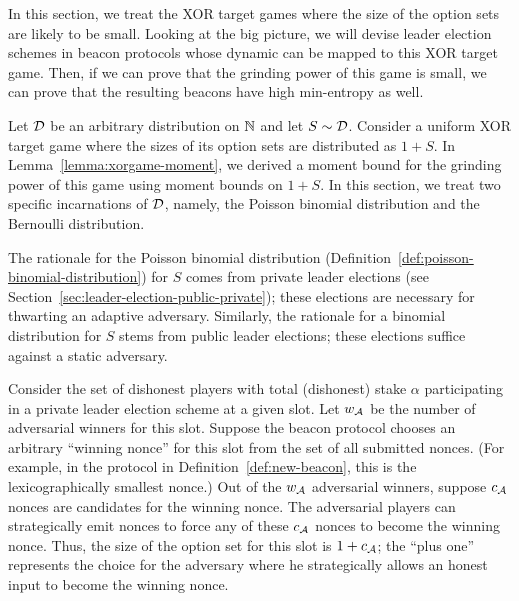 
In this section, 
we treat the XOR target games where 
the size of the option sets are likely to be small. 
Looking at the big picture, 
we will devise leader election schemes in beacon protocols 
whose dynamic can be mapped to this XOR target game.
Then, if we can prove that the grinding power of this game is small, 
we can prove that the resulting beacons have high min-entropy as well.



Let $\mathcal{D}$ be an arbitrary distribution on $\mathbb{N}$ 
and let $S \sim \mathcal{D}$.
Consider a uniform XOR target game where 
the sizes of its option sets are distributed as $1 + S$. 
In Lemma~\ref{lemma:xorgame-moment}, 
we derived a moment bound for the grinding power of this game using moment bounds on $1 + S$. 
In this section, we treat two specific incarnations of $\mathcal{D}$, 
namely, the Poisson binomial distribution and 
the Bernoulli distribution.

The rationale for the Poisson binomial distribution (Definition~\ref{def:poisson-binomial-distribution}) 
for $S$ 
comes from private leader elections (see Section~\ref{sec:leader-election-public-private});
these elections are necessary for thwarting an adaptive adversary.
Similarly, the rationale for a binomial distribution for $S$ stems from 
public leader elections; 
these elections suffice against a static adversary.

Consider the set of dishonest players with total (dishonest) stake $\alpha$ 
participating 
in a private leader election scheme 
at a given slot. 
Let $w_{\mathcal{A}}$ be the number of adversarial winners for this slot.
Suppose the beacon protocol chooses an arbitrary ``winning nonce'' for this slot from the set of all submitted nonces.  
(For example, in the protocol in Definition~\ref{def:new-beacon}, this is the lexicographically smallest nonce.)
Out of the $w_{\mathcal{A}}$ adversarial winners, 
suppose $c_{\mathcal{A}}$ nonces are candidates for the winning nonce. 
The adversarial players can strategically emit nonces 
to force any of these $c_{\mathcal{A}}$ nonces to become the winning nonce.
Thus, the size of the option set for this slot is $1 + c_{\mathcal{A}}$; 
the ``plus one'' represents the choice for the adversary where 
he strategically allows an honest input to become the winning nonce. 

